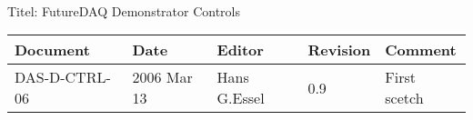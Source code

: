 \\Titel: FutureDAQ Demonstrator Controls
\begin{table}[h]
\begin{tabular}{|p{2.8cm}|p{2.0cm}|p{3.0cm}|p{1.6cm}|p{5.0cm}|} \hline
Document   & Date        & Editor       & Revision & Comment \\
\hline DAS-D-CTRL-06 & 2006 Mar 13 & Hans G.Essel & 0.9      &
First scetch \\ \hline
\end{tabular}
\end{table}
